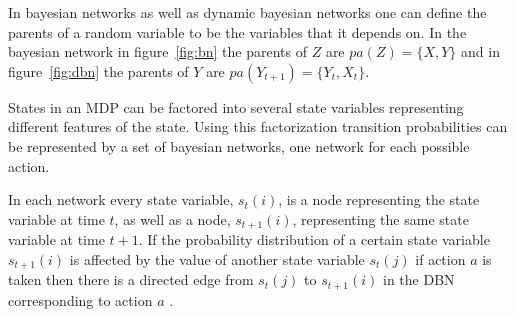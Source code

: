 In bayesian networks as well as dynamic bayesian networks one can define the
parents of a random variable to be the variables that it depends on. In the
bayesian network in figure~\ref{fig:bn} the parents of $Z$ are $pa(Z) = \{X,
Y\}$ and in figure~\ref{fig:dbn} the parents of $Y$ are $pa(Y_{t+1}) = \{Y_t,
X_t\}$.

States in an MDP can be factored into several state variables representing
different features of the state. Using this factorization transition
probabilities can be represented by a set of bayesian networks, one network for
each possible action. 

In each network every state variable, $s_t(i)$, is a node representing the
state variable at time $t$, as well as a node, $s_{t+1}(i)$, representing the same state
variable at time $t+1$. If the probability distribution of a certain state
variable $s_{t+1}(i)$ is affected by the value of another state variable
$s_t(j)$ if action $a$ is taken then there is a directed edge from $s_t(j)$ to
$s_{t+1}(i)$ in the DBN corresponding to action $a$
\parencite{guestrin2003efficient}.
